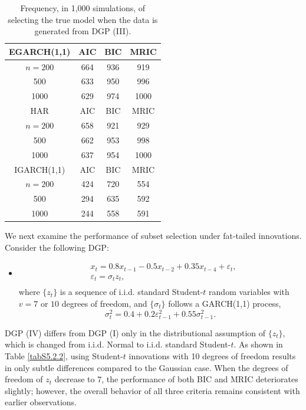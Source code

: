 \documentclass[ejsv2]{imsart}
\theoremstyle{plain}
\theoremstyle{definition}
\theoremstyle{remark}
\begin{document}
\begin{table}
\caption{Frequency, in 1,000 simulations, of selecting the true model when the data is generated from DGP {\rm (III)}.}
\label{tabS5.2}
\centering
\begin{tabular}{cccc}
EGARCH(1,1)  & AIC & BIC & MRIC \\ \hline
   $n= 200$ & 664 & 936 & 919 \\
   500 & 633 & 950 & 996  \\
   1000 & 629 & 974 & 1000 \\  \hline
  HAR& AIC & BIC & MRIC \\ \hline
   $n=200$ & 658 & 921 & 929 \\
   500 & 662 & 953 & 998  \\
   1000 & 637 & 954 & 1000 \\  \hline
   IGARCH(1,1) & AIC & BIC & MRIC \\ \hline
  $n=200$ & 424 & 720 & 554 \\
   500 & 294 & 635 & 592  \\
   1000 & 244 & 558 & 591 \\  \hline
  \end{tabular}
\end{table}

We next examine the performance of subset selection under fat-tailed innovations. Consider the following DGP:

\begin{itemize}
  \item [(IV)]
  \begin{equation*}
\begin{split}
     & x_t=0.8x_{t-1}-0.5x_{t-2}+0.35x_{t-4}+\varepsilon_t, \\
     & \varepsilon_t=\sigma_tz_t,  \\
\end{split}
\end{equation*}
where $\{z_t\}$ is a sequence of  
i.i.d. standard Student-$t$ random variables with $v=7$ or $10$ degrees of freedom, 
and $\{\sigma_t\}$ follows a GARCH(1,1) process,
\begin{equation*}
\sigma_t^2=0.4+0.2\varepsilon_{t-1}^2+0.55\sigma_{t-1}^2.
\end{equation*}
\end{itemize}

DGP (IV) differs from DGP (I) only in the distributional assumption of $\{z_t\}$, which is changed from i.i.d. Normal to i.i.d. standard Student-$t$. As shown in Table \ref{tabS5.2.2}, using Student-$t$ innovations with 10 degrees of freedom results in only subtle differences compared to the Gaussian case. When the degrees of freedom of $z_t$ decrease to 7, the performance of both BIC and MRIC deteriorates slightly; however, the overall behavior of all three criteria remains consistent with earlier observations.
\end{document}
